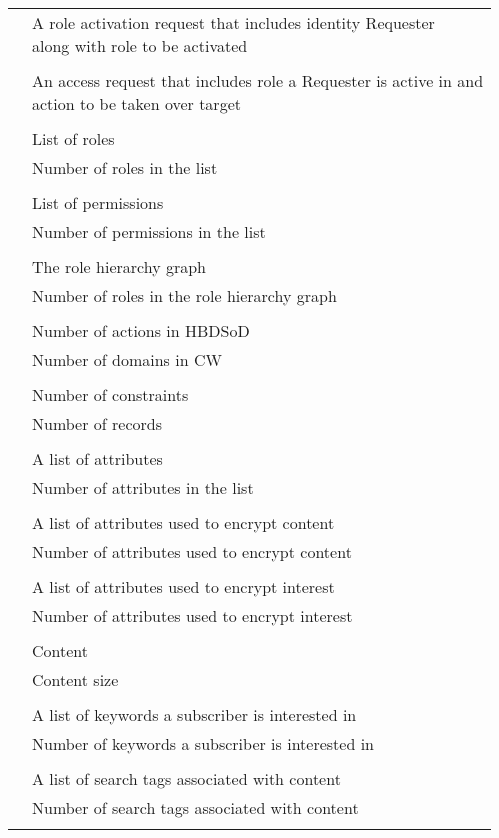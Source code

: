 \documentclass[epsfig,a4paper,11pt,titlepage]{book}
\numberwithin{algorithm}{chapter}
\begin{document}
\begin{longtable}{l l}
 & \makecell[l]{A role activation request that includes identity Requester  \\ along with role  to be activated} \\ \\
 & \makecell[l]{An access request that includes role  a Requester is active in and \\ action  to be taken over target } \\ \\
 & List of roles \\
 & Number of roles in the list \\ \\
 & List of permissions \\
 & Number of permissions in the list \\ \\
 & The role hierarchy graph \\
 & Number of roles in the role hierarchy graph \\ \\
 & Number of actions in \acrshort{HBDSoD} \\
 & Number of domains in \acrshort{CW} \\ \\
 & Number of constraints \\
 & Number of records \\ \\
 & A list of attributes \\
 & Number of attributes in the list \\ \\
 & A list of attributes used to encrypt content \\
 & Number of attributes used to encrypt content \\ \\
 & A list of attributes used to encrypt interest \\
 & Number of attributes used to encrypt interest \\ \\
 & Content \\
 & Content size \\ \\
 & A list of keywords a subscriber is interested in \\
 & Number of keywords a subscriber is interested in \\ \\
 & A list of search tags associated with content \\
 & Number of search tags associated with content \\ \\
\end{longtable}
\end{document}
